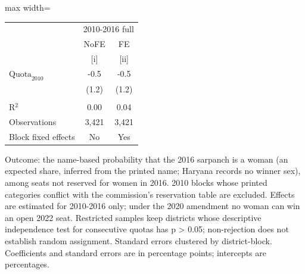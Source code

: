 
\begingroup
\centering
\scriptsize
\begin{adjustbox}{max width=\linewidth}
   \begin{threeparttable}[b]
      \begin{tabular}{lcc}
         \toprule
          & \multicolumn{2}{c}{2010-2016 full} \\
                                & NoFE  & FE \\
                                & [i]   & [ii]\\
         \midrule
         $\text{Quota}_{2010}$  & -0.5  & -0.5\\
                                & (1.2) & (1.2)\\
          \\
         R$^2$                  & 0.00  & 0.04\\
         Observations           & 3,421 & 3,421\\
         Block fixed effects    & No    & Yes\\
         \bottomrule
      \end{tabular}

      \begin{tablenotes}
         \item Outcome: the name-based probability that the 2016 sarpanch is a woman (an expected share, inferred from the printed name; Haryana records no winner sex), among seats not reserved for women in 2016. 2010 blocks whose printed categories conflict with the commission's reservation table are excluded. Effects are estimated for 2010-2016 only; under the 2020 amendment no woman can win an open 2022 seat. Restricted samples keep districts whose descriptive independence test for consecutive quotas has p > 0.05; non-rejection does not establish random assignment. Standard errors clustered by district-block. Coefficients and standard errors are in percentage points; intercepts are percentages.
      \end{tablenotes}
   \end{threeparttable}
\end{adjustbox}
\par\endgroup



